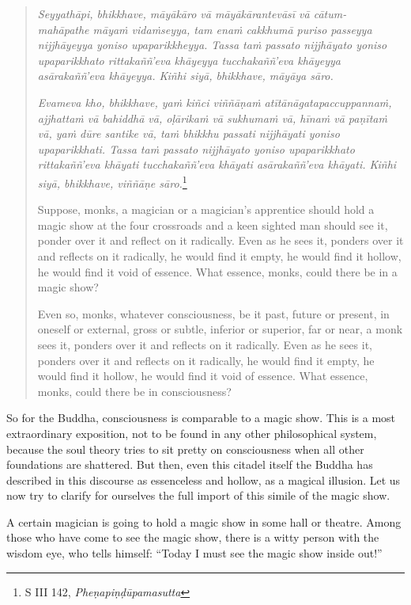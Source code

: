 \begin{quote}
\emph{Seyyathāpi, bhikkhave, māyākāro vā māyākārantevāsī vā cātum-\\ mahāpathe māyaṁ vidaṁseyya, tam enaṁ cakkhumā puriso passeyya nijjhāyeyya yoniso upaparikkheyya. Tassa taṁ passato nijjhāyato yoniso upaparikkhato rittakaññ'eva khāyeyya tucchakaññ'eva khāyeyya asārakaññ'eva khāyeyya. Kiñhi siyā, bhikkhave, māyāya sāro.}

\emph{Evameva kho, bhikkhave, yaṁ kiñci viññāṇaṁ atītānāgatapaccuppannaṁ, ajjhattaṁ vā bahiddhā vā, oḷārikaṁ vā sukhumaṁ vā, hīnaṁ vā paṇītaṁ vā, yaṁ dūre santike vā, taṁ bhikkhu passati nijjhāyati yoniso upaparikkhati. Tassa taṁ passato nijjhāyato yoniso upaparikkhato rittakaññ'eva khāyati tucchakaññ'eva khāyati asārakaññ'eva khāyati. Kiñhi siyā, bhikkhave, viññāṇe sāro.}\footnote{S III 142, \emph{Pheṇapiṇḍūpamasutta}}

Suppose, monks, a magician or a magician's apprentice should hold a magic show at the four crossroads and a keen sighted man should see it, ponder over it and reflect on it radically. Even as he sees it, ponders over it and reflects on it radically, he would find it empty, he would find it hollow, he would find it void of essence. What essence, monks, could there be in a magic show?

Even so, monks, whatever consciousness, be it past, future or present, in oneself or external, gross or subtle, inferior or superior, far or near, a monk sees it, ponders over it and reflects on it radically. Even as he sees it, ponders over it and reflects on it radically, he would find it empty, he would find it hollow, he would find it void of essence. What essence, monks, could there be in consciousness?
\end{quote}

So for the Buddha, consciousness is comparable to a magic show. This is a most extraordinary exposition, not to be found in any other philosophical system, because the soul theory tries to sit pretty on consciousness when all other foundations are shattered. But then, even this citadel itself the Buddha has described in this discourse as essenceless and hollow, as a magical illusion. Let us now try to clarify for ourselves the full import of this simile of the magic show.

A certain magician is going to hold a magic show in some hall or theatre. Among those who have come to see the magic show, there is a witty person with the wisdom eye, who tells himself: ``Today I must see the magic show inside out!''

